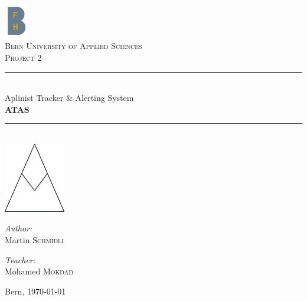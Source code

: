 \documentclass[a4paper,11pt, oneside]{report}
\theoremstyle{definition}
\begin{document}
\pagestyle{empty} %
\begin{titlepage}
\begin{center}

\includegraphics[width=0.08\textwidth]{img/bfh_logo.png}\\[1cm]    
\textsc{\LARGE Bern University of Applied Sciences}\\[1.5cm]
\textsc{\Large Project 2}\\[0.5cm]

\newcommand{\HRule}{\rule{\linewidth}{0.3mm}}
\HRule \\[0.4cm]
{\huge Aplinist Tracker \& Alerting System}\\[0.3cm]
{\huge \bfseries  ATAS}
\HRule \\[2cm]

\includegraphics[width=0.2\textwidth]{img/atas_logo.png}\\[3cm]    

\begin{minipage}{0.4\textwidth}
\begin{flushleft} \large
\emph{Author:}\\
Martin \textsc{Schmidli}\\
\end{flushleft}
\end{minipage}
\hfill
\begin{minipage}{0.4\textwidth}
\begin{flushright} \large
\emph{Teacher:} \\
Mohamed \textsc{Mokdad}
\end{flushright}
\end{minipage}
\vfill

Bern, {\large \today}
\end{center}
\end{titlepage}
\pagestyle{fancy}

\tableofcontents
\end{document}
